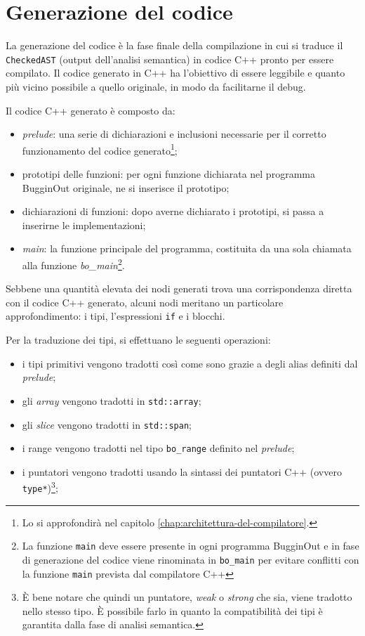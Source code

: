 \section{Generazione del codice}
\label{sec:generazione-del-codice}

La generazione del codice \`e la fase finale della compilazione in cui si traduce il \texttt{CheckedAST} (output dell'analisi semantica) in codice C++ pronto per essere compilato. Il codice generato in C++ ha l'obiettivo di essere leggibile e quanto pi\`u vicino possibile a quello originale, in modo da facilitarne il debug.

Il codice C++ generato \`e composto da:
\begin{itemize}
	\item \emph{prelude}: una serie di dichiarazioni e inclusioni necessarie per il corretto funzionamento del codice generato\footnote{Lo si approfondir\`a nel capitolo \ref{chap:architettura-del-compilatore}.};
	\item prototipi delle funzioni: per ogni funzione dichiarata nel programma BugginOut originale, ne si inserisce il prototipo;
	\item dichiarazioni di funzioni: dopo averne dichiarato i prototipi, si passa a inserirne le implementazioni;
	\item \emph{main}: la funzione principale del programma, costituita da una sola chiamata alla funzione \emph{bo\_main}\footnote{La funzione \texttt{main} deve essere presente in ogni programma BugginOut e in fase di generazione del codice viene rinominata in \texttt{bo\_main} per evitare conflitti con la funzione \texttt{main} prevista dal compilatore C++}.
\end{itemize}

Sebbene una quantit\`a elevata dei nodi generati trova una corrispondenza diretta con il codice C++ generato, alcuni nodi meritano un particolare approfondimento: i tipi, l'espressioni \texttt{if} e i blocchi.

Per la traduzione dei tipi, si effettuano le seguenti operazioni:
\begin{itemize}
	\item i tipi primitivi vengono tradotti cos\`i come sono grazie a degli alias definiti dal \emph{prelude};
	\item gli \emph{array} vengono tradotti in \texttt{std::array};
	\item gli \emph{slice} vengono tradotti in \texttt{std::span};
	\item i range vengono tradotti nel tipo \texttt{bo\_range} definito nel \emph{prelude};
	\item i puntatori vengono tradotti usando la sintassi dei puntatori C++ (ovvero \texttt{type*})\footnote{\`E bene notare che quindi un puntatore, \emph{weak} o \emph{strong} che sia, viene tradotto nello stesso tipo. \`E possibile farlo in quanto la compatibilit\`a dei tipi \`e garantita dalla fase di analisi semantica.};
\end{itemize}

